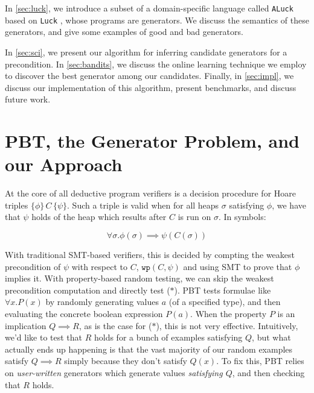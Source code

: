 \documentclass[sigconf,nonacm]{acmart}
\begin{document}
In \autoref{sec:luck}, we introduce a subset of a domain-specific language called \texttt{ALuck} based on \texttt{Luck} \cite{luck}, whose programs are generators. We discuss the semantics of these generators, and give some examples of good and bad generators.

In \autoref{sec:sci}, we present our algorithm for inferring candidate generators for a precondition. In \autoref{sec:bandits}, we discuss the online learning technique we employ to discover the best generator among our candidates. Finally, in \autoref{sec:impl}, we discuss our implementation of this algorithm, present benchmarks, and discuss future work.



\section{PBT, the Generator Problem, and our Approach}
\label{sec:pbt}
At the core of all deductive program verifiers is a decision procedure for Hoare triples $\{\phi\}\, C \, \{\psi\}$. Such a triple is valid when for all heaps $\sigma$ satisfying $\phi$, we have that $\psi$ holds of the heap which results after $C$ is run on $\sigma$. In symbols:

\[
\forall \sigma. \phi(\sigma) \implies \psi(C(\sigma)) \tag{$\ast$}
\]

With traditional SMT-based verifiers, this is decided by compting the weakest precondition of $\psi$ with respect to $C$, $\texttt{wp}(C,\psi)$ and using SMT to prove that $\phi$ implies it. With property-based random testing, we can skip the weakest precondition computation and directly test ($\ast$). PBT tests formulae like $\forall x. P(x)$ by randomly generating values $a$ (of a specified type), and then evaluating the concrete boolean expression $P(a)$. When the property $P$ is an implication $Q \implies R$, as is the case for ($\ast$), this is not very effective. Intuitively, we'd like to test that $R$ holds for a bunch of examples satisfying $Q$, but what actually ends up happening is that the vast majority of our random examples satisfy $Q \implies R$ simply because they don't satisfy $Q(x)$. To fix this, PBT relies on \textit{user-written} generators which generate values \textit{satisfying $Q$}, and then checking that $R$ holds.
\end{document}
